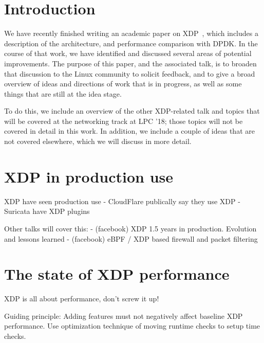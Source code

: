 \documentclass[sigconf]{acmart}
\begin{document}
\maketitle

\section{Introduction}%
\label{sec:introduction}

We have recently finished writing an academic paper on XDP~\cite{xdp-paper},
which includes a description of the architecture, and performance comparison
with DPDK. In the course of that work, we have identified and discussed several
areas of potential improvements. The purpose of this paper, and the associated
talk, is to broaden that discussion to the Linux community to solicit feedback,
and to give a broad overview of ideas and directions of work that is in
progress, as well as some things that are still at the idea stage.

To do this, we include an overview of the other XDP-related talk and topics that
will be covered at the networking track at LPC '18; those topics will not be
covered in detail in this work. In addition, we include a couple of ideas that
are not covered elsewhere, which we will discuss in more detail.

\section{XDP in production use}
\label{sec:xdp-production-use}

XDP have seen production use
 - CloudFlare publically say they use XDP
 - Suricata have XDP plugins

Other talks will cover this:
 - (facebook) XDP 1.5 years in production. Evolution and lessons learned
 - (facebook) eBPF / XDP based firewall and packet filtering

 \section{The state of XDP performance}
\label{sec:state-xdp-perf}

XDP is all about performance, don't screw it up!

Guiding principle: Adding features must not negatively affect baseline XDP
performance.  Use optimization technique of moving runtime checks to setup time
checks.

\end{document}
